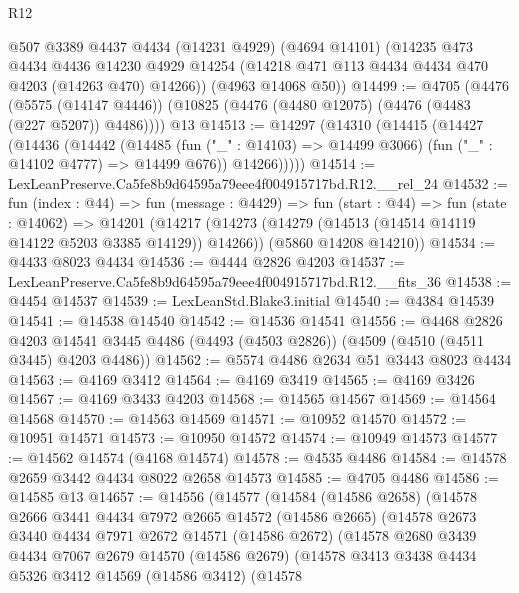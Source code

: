 \begin{lexlean}{R12}
\begin{coremodule}
      @507
      @3389
      @4437
      @4434
      (@14231 @4929)
      (@4694 @14101)
      (@14235
        @473
        @4434
        @4436
        @14230
        @4929
        @14254
        (@14218 @471 @113 @4434 @4434 @470 @4203 (@14263 @470) @14266))
      (@4963 @14068 @50))
@14499 := @4705
    (@4476
      (@5575 (@14147 @4446))
      (@10825 (@4476 (@4480 @12075) (@4476 (@4483 (@227 @5207)) @4486))))
    @13
@14513 := @14297
    (@14310
      (@14415
        (@14427
          (@14436
            (@14442
              (@14485
                (fun ("_" : @14103) => @14499 @3066)
                (fun ("_" : @14102 @4777) => @14499 @676))
              @14266)))))
@14514 := LexLeanPreserve.Ca5fe8b9d64595a79eee4f004915717bd.R12.__rel_24
@14532 := fun (index : @44) =>
  fun (message : @4429) =>
  fun (start : @44) =>
  fun (state : @14062) =>
  @14201
    (@14217
      (@14273 (@14279 (@14513 (@14514 @14119 @14122 @5203 @3385 @14129)) @14266))
      (@5860 @14208 @14210))
@14534 := @4433 @8023 @4434
@14536 := @4444 @2826 @4203
@14537 := LexLeanPreserve.Ca5fe8b9d64595a79eee4f004915717bd.R12.__fits_36
@14538 := @4454 @14537
@14539 := LexLeanStd.Blake3.initial
@14540 := @4384 @14539
@14541 := @14538 @14540
@14542 := @14536 @14541
@14556 := @4468
    @2826
    @4203
    @14541
    @3445
    @4486
    (@4493 (@4503 @2826))
    (@4509 (@4510 (@4511 @3445) @4203 @4486))
@14562 := @5574 @4486 @2634 @51 @3443 @8023 @4434
@14563 := @4169 @3412
@14564 := @4169 @3419
@14565 := @4169 @3426
@14567 := @4169 @3433 @4203
@14568 := @14565 @14567
@14569 := @14564 @14568
@14570 := @14563 @14569
@14571 := @10952 @14570
@14572 := @10951 @14571
@14573 := @10950 @14572
@14574 := @10949 @14573
@14577 := @14562 @14574 (@4168 @14574)
@14578 := @4535 @4486
@14584 := @14578 @2659 @3442 @4434 @8022 @2658 @14573
@14585 := @4705 @4486
@14586 := @14585 @13
@14657 := @14556
    (@14577
      (@14584
        (@14586 @2658)
        (@14578
          @2666
          @3441
          @4434
          @7972
          @2665
          @14572
          (@14586 @2665)
          (@14578
            @2673
            @3440
            @4434
            @7971
            @2672
            @14571
            (@14586 @2672)
            (@14578
              @2680
              @3439
              @4434
              @7067
              @2679
              @14570
              (@14586 @2679)
              (@14578
                @3413
                @3438
                @4434
                @5326
                @3412
                @14569
                (@14586 @3412)
                (@14578

\end{coremodule}
\end{lexlean}
